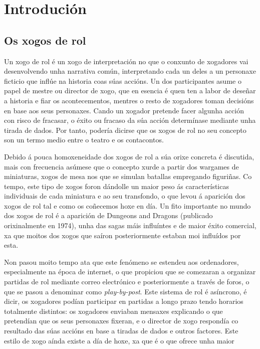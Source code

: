 \chapter{Introdución}

\section{Os xogos de rol}
Un xogo de rol é un xogo de interpretación no que o conxunto de xogadores vai
desenvolvendo unha narrativa común, interpretando cada un deles a un personaxe
ficticio que inflúe na historia coas súas accións. Un dos participantes asume o
papel de mestre ou director de xogo, que en esencia é  quen ten a
labor de deseñar a historia e fiar os acontecementos, mentres o resto de xogadores
toman decisións en base aos seus personaxes. Cando un xogador pretende facer
algunha acción con risco de fracasar, o éxito ou fracaso da súa acción
determínase mediante unha tirada de dados. Por tanto, podería dicirse que os
xogos de rol no seu concepto son un termo medio entre o teatro e os contacontos.
\par
Debido á pouca homoxeneidade dos xogos de rol a súa orixe concreta é
discutida, mais con frecuencia asúmese que o concepto xurde a partir dos
wargames de miniaturas, xogos de mesa nos que se simulan batallas
empregando figuriñas\cite{gamingasculture}. Co tempo, este tipo de xogos foron
dándolle un maior peso ás características individuais de cada miniatura e ao seu
transfondo, o que levou á aparición dos xogos de rol tal e como os coñecemos
hoxe en día. Un fito importante no mundo dos xogos de rol é a aparición de
Dungeons and Dragons (publicado orixinalmente en 1974), unha das sagas máis
influíntes e de maior éxito comercial, xa que moitos dos xogos que saíron
posteriormente estaban moi influídos por esta.
\par
Non pasou moito tempo ata que este fenómeno se estendeu aos ordenadores,
especialmente na época de internet, o que propiciou que se comezaran a organizar
partidas de rol mediante correo electrónico e posteriormente a través de foros,
o que se pasou a denominar como {\it play-by-post}. Este sistema de rol é
asíncrono, é dicir, os xogadores podían participar en partidas a longo prazo
tendo horarios totalmente distintos: os xogadores enviaban mensaxes explicando o
que pretendían que os seus personaxes fixeran, e o director de xogo respondía co
resultado das súas accións en base a tiradas de dados e outros factores. Este
estilo de xogo aínda existe a día de hoxe, xa que é o que ofrece unha maior
